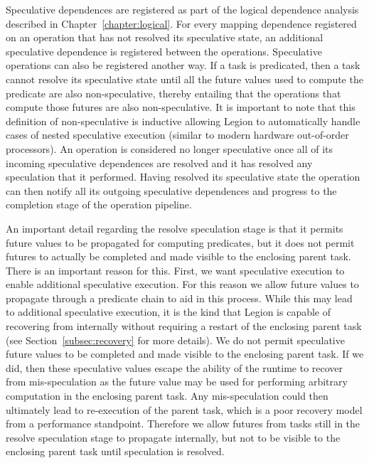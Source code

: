 Speculative dependences are registered as part of the 
logical dependence analysis described in 
Chapter~\ref{chapter:logical}. For every mapping dependence
registered on an operation that has not resolved its
speculative state, an additional speculative dependence
is registered between the operations. Speculative operations
can also be registered another way. If a task is 
predicated, then a task cannot resolve its speculative state
until all the future values used to compute the predicate
are also non-speculative, thereby entailing that the operations
that compute those futures are also non-speculative. It
is important to note that this definition of non-speculative
is inductive allowing Legion to automatically handle cases
of nested speculative execution (similar to modern hardware
out-of-order processors). An operation is considered no
longer speculative once all of its incoming speculative
dependences are resolved and it has resolved any speculation
that it performed. Having resolved its speculative state
the operation can then notify all its outgoing speculative
dependences and progress to the completion stage of the
operation pipeline.

An important detail regarding the resolve speculation stage
is that it permits future values to be propagated for 
computing predicates, but it does not permit futures to 
actually be completed and made visible to the enclosing
parent task. There is an important reason for this. First,
we want speculative execution to enable additional speculative
execution. For this reason we allow 
future values to propagate through a predicate chain to aid
in this process. While this may lead to additional speculative
execution, it is the kind that Legion is capable of recovering
from internally without requiring a restart of the enclosing
parent task (see Section~\ref{subsec:recovery} for more
details). We do not permit speculative future values to be
completed and made visible to the enclosing parent task. If
we did, then these speculative values escape the ability of
the runtime to recover from mis-speculation as the future
value may be used for performing arbitrary computation
in the enclosing parent task. Any mis-speculation could then
ultimately lead to re-execution of the parent task, which
is a poor recovery model from a performance standpoint. Therefore
we allow futures from tasks still in the resolve speculation
stage to propagate internally, but not to be visible to
the enclosing parent task until speculation is resolved.

